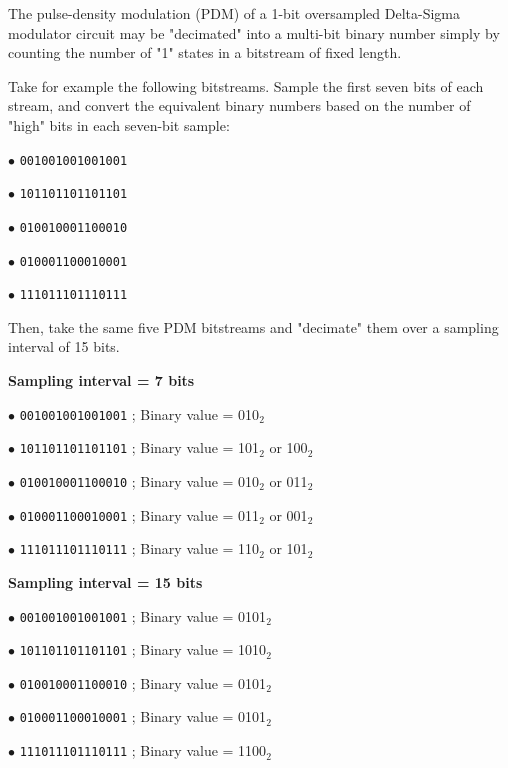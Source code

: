 

The pulse-density modulation (PDM) of a 1-bit oversampled Delta-Sigma modulator circuit may be "decimated" into a multi-bit binary number simply by counting the number of "1" states in a bitstream of fixed length.

\vskip 10pt

\goodbreak
Take for example the following bitstreams.  Sample the first seven bits of each stream, and convert the equivalent binary numbers based on the number of "high" bits in each seven-bit sample:

\medskip
\item{$\bullet$} {\tt 001001001001001}
\vskip 10pt
\item{$\bullet$} {\tt 101101101101101}
\vskip 10pt
\item{$\bullet$} {\tt 010010001100010}
\vskip 10pt
\item{$\bullet$} {\tt 010001100010001}
\vskip 10pt
\item{$\bullet$} {\tt 111011101110111}
\medskip

Then, take the same five PDM bitstreams and "decimate" them over a sampling interval of 15 bits.







{\bf Sampling interval = 7 bits}

\medskip
\item{$\bullet$} {\tt 001001001001001} ; Binary value = 010$_{2}$
\vskip 10pt
\item{$\bullet$} {\tt 101101101101101} ; Binary value = 101$_{2}$ or 100$_{2}$
\vskip 10pt
\item{$\bullet$} {\tt 010010001100010} ; Binary value = 010$_{2}$ or 011$_{2}$
\vskip 10pt
\item{$\bullet$} {\tt 010001100010001} ; Binary value = 011$_{2}$ or 001$_{2}$
\vskip 10pt
\item{$\bullet$} {\tt 111011101110111} ; Binary value = 110$_{2}$ or 101$_{2}$
\medskip

\vskip 10pt

{\bf Sampling interval = 15 bits}

\medskip
\item{$\bullet$} {\tt 001001001001001} ; Binary value = 0101$_{2}$
\vskip 10pt
\item{$\bullet$} {\tt 101101101101101} ; Binary value = 1010$_{2}$
\vskip 10pt
\item{$\bullet$} {\tt 010010001100010} ; Binary value = 0101$_{2}$
\vskip 10pt
\item{$\bullet$} {\tt 010001100010001} ; Binary value = 0101$_{2}$ 
\vskip 10pt
\item{$\bullet$} {\tt 111011101110111} ; Binary value = 1100$_{2}$
\medskip

